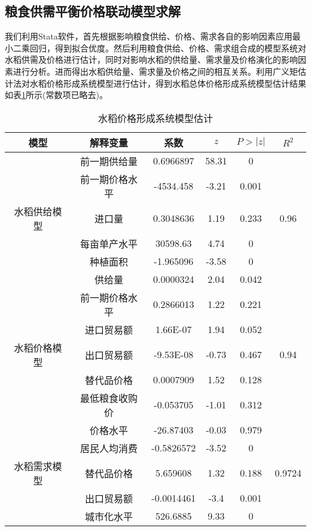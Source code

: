 \documentclass[withoutpreface,bwprint]{cumcmthesis} %
\begin{document}
		
\subsection{粮食供需平衡价格联动模型求解}
我们利用Stata软件，首先根据影响粮食供给、价格、需求各自的影响因素应用最小二乘回归，得到拟合优度。然后利用粮食供给、价格、需求组合成的模型系统对水稻供需及价格进行估计，同时对影响水稻的供给量、需求量及价格演化的影响因素进行分析。进而得出水稻供给量、需求量及价格之间的相互关系。利用广义矩估计法对水稻价格形成系统模型进行估计，得到水稻总体价格形成系统模型估计结果如表\ref{tab:jgxc}所示(常数项已略去)。\par


\begin{table}[htbp]
\linespread{1.5}
  \centering
  \caption{水稻价格形成系统模型估计}
    \begin{tabular}{cccccc}
    \toprule[2pt]
     模型&解释变量     & 系数    & $z$ & $P>|z|$ & $R^2$ \\
\hline    
	&前一期供给量   & 0.6966897 & 58.31 & 0     & \\
    &前一期价格水平  & -4534.458 & -3.21 & 0.001 &  \\
    水稻供给模型&进口量   & 0.3048636 & 1.19  & 0.233 & 0.96 \\
    &每亩单产水平   & 30598.63 & 4.74  & 0     &  \\
    &种植面积   & -1.965096 & -3.58 & 0     &  \\
\hline    
	&供给量  & 0.0000324 & 2.04  & 0.042 &  \\
    &前一期价格水平   & 0.2866013 & 1.22  & 0.221 &  \\
  &进口贸易额  & 1.66E-07 & 1.94  & 0.052 &  \\
    水稻价格模型&出口贸易额  & -9.53E-08 & -0.73 & 0.467 & 0.94 \\
    &替代品价格  & 0.0007909 & 1.52  & 0.128 &  \\
    &最低粮食收购价   & -0.053705 & -1.01 & 0.312 &  \\
\hline 
    &价格水平  & -26.87403 & -0.03 & 0.979 & \\
	&居民人均消费	  & -0.5826572 & -3.52 & 0     &  \\
  水稻需求模型&替代品价格   & 5.659608 & 1.32  & 0.188 & 0.9724 \\
    &出口贸易额  & -0.0014461 & -3.4  & 0.001 &  \\
    &城市化水平   & 526.6885 & 9.33  & 0     &  \\
   \bottomrule[2pt]
   \end{tabular}%
  \label{tab:jgxc}%
\end{table}%
\end{document}
